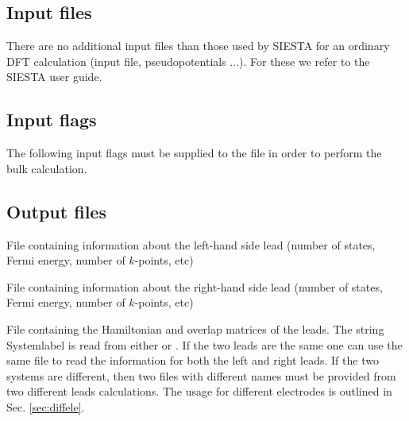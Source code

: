 \documentclass[11pt]{article}
\begin{document}
\subsection{Input files}
There are no additional input files than those used by SIESTA for an ordinary DFT calculation (input file, pseudopotentials ...). For these we refer to the SIESTA user guide. 

\subsection{Input flags}
The following input flags must be supplied to the  file in order to perform the bulk calculation.\\
\vspace{0.3cm}



\subsection{Output files}

\vspace{0.5cm}
{File containing information about the left-hand side lead (number of states, Fermi energy, number of $k$-points, etc)}

{File containing information about the right-hand side lead (number of states, Fermi energy, number of $k$-points, etc)}

{File containing the Hamiltonian and overlap matrices of the leads. The string Systemlabel is read from either  or . If the two leads are the same one can use the same  file to read the information for both the left and right leads. If the two systems are different, then two files with different names must be provided from two different leads calculations. The usage for different electrodes is outlined in Sec. \ref{sec:diffele}.}
\end{document}
